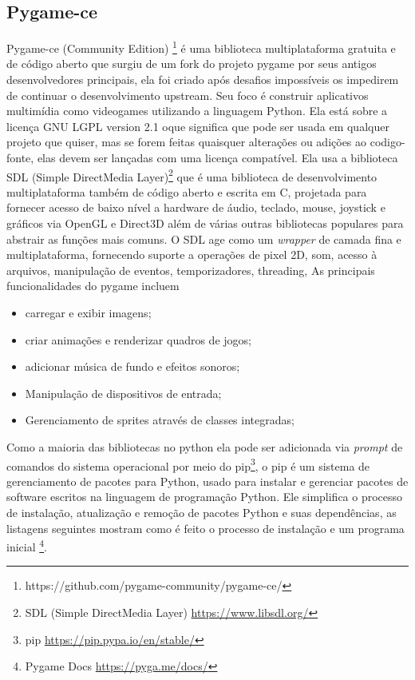 \subsection{Pygame-ce}
Pygame-ce (Community Edition) \footnote{https://github.com/pygame-community/pygame-ce/} é uma biblioteca multiplataforma gratuita e de código aberto que surgiu de um fork do projeto pygame por seus antigos desenvolvedores principais, ela foi criado após desafios impossíveis os impedirem de continuar o desenvolvimento upstream. Seu foco é construir aplicativos multimídia como videogames utilizando a linguagem Python. Ela está sobre a licença GNU LGPL version 2.1 oque significa que pode ser usada em qualquer projeto que quiser, mas se forem feitas quaisquer alterações ou adições ao codigo-fonte, elas devem ser lançadas com uma licença compatível. 
 Ela usa a biblioteca SDL (Simple DirectMedia Layer)\footnote{SDL (Simple DirectMedia Layer) \url{https://www.libsdl.org/}} que é uma biblioteca de desenvolvimento multiplataforma também de código aberto e escrita em C, projetada para fornecer acesso de baixo nível a hardware de áudio, teclado, mouse, joystick e gráficos via OpenGL e Direct3D além de várias outras bibliotecas populares para abstrair as funções mais comuns. O SDL age como um \textit{wrapper} de camada fina e multiplataforma, fornecendo suporte a operações de pixel 2D, som, acesso à arquivos, manipulação de eventos, temporizadores, threading,
As principais funcionalidades do pygame incluem
\begin{itemize}
    \item carregar e exibir imagens;
    \item criar animações e renderizar quadros de jogos;
    \item adicionar música de fundo e efeitos sonoros;
    \item Manipulação de dispositivos de entrada;
    \item Gerenciamento de sprites através de classes integradas;
\end{itemize}

Como a maioria das bibliotecas no python ela pode ser adicionada via \textit{prompt} de comandos do sistema operacional  por meio do pip\footnote{pip \url{https://pip.pypa.io/en/stable/}}, o pip é um sistema de gerenciamento de pacotes para Python, usado para instalar e gerenciar pacotes de software escritos na linguagem de programação Python. Ele simplifica o processo de instalação, atualização e remoção de pacotes Python e suas dependências, as listagens seguintes mostram como é feito o processo de instalação e um programa inicial \footnote{Pygame Docs \url{https://pyga.me/docs/}}. 

